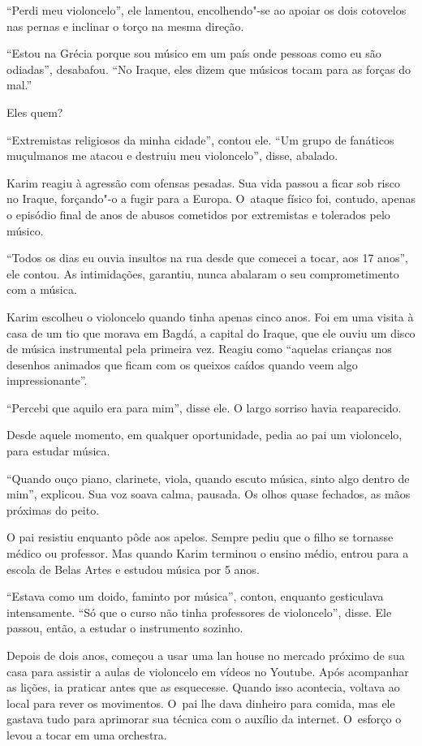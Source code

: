 ``Perdi meu violoncelo'', ele lamentou, encolhendo"-se ao apoiar os dois
cotovelos nas pernas e inclinar o torço na mesma direção.

``Estou na Grécia porque sou músico em um país onde pessoas como eu são
odiadas'', desabafou. ``No Iraque, eles dizem que músicos tocam para as
forças do mal.''

Eles quem?

``Extremistas religiosos da minha cidade'', contou ele. ``Um grupo de
fanáticos muçulmanos me atacou e destruiu meu violoncelo'', disse,
abalado.

Karim reagiu à agressão com ofensas pesadas. Sua vida passou a ficar sob
risco no Iraque, forçando"-o a fugir para a Europa. O~ataque físico foi,
contudo, apenas o episódio final de anos de abusos cometidos por
extremistas e tolerados pelo músico.

``Todos os dias eu ouvia insultos na rua desde que comecei a tocar, aos
17 anos'', ele contou.  As intimidações, garantiu, nunca abalaram o seu
comprometimento com a música.

Karim escolheu o violoncelo quando tinha apenas cinco anos. Foi em uma
visita à casa de um tio que morava em Bagdá, a capital do Iraque, que
ele ouviu um disco de música instrumental pela primeira vez. Reagiu como
``aquelas crianças nos desenhos animados que ficam com os queixos caídos
quando veem algo impressionante''.

``Percebi que aquilo era para mim'', disse ele. O largo sorriso havia
reaparecido.

Desde aquele momento, em qualquer oportunidade, pedia ao pai um
violoncelo, para estudar música.

``Quando ouço piano, clarinete, viola, quando escuto música, sinto algo
dentro de mim'', explicou. Sua voz soava calma, pausada. Os olhos quase
fechados, as mãos próximas do peito.

O pai resistiu enquanto pôde aos apelos. Sempre pediu que o filho se
tornasse médico ou professor. Mas quando Karim terminou o ensino médio,
entrou para a escola de Belas Artes e estudou música por 5 anos.

``Estava como um doido, faminto por música'', contou, enquanto
gesticulava intensamente. ``Só que o curso não tinha professores de
violoncelo'', disse. Ele passou, então, a estudar o instrumento sozinho.

Depois de dois anos, começou a usar uma lan house no mercado próximo de
sua casa para assistir a aulas de violoncelo em vídeos no Youtube. Após
acompanhar as lições, ia praticar antes que as esquecesse. Quando isso
acontecia, voltava ao local para rever os movimentos. O~pai lhe dava
dinheiro para comida, mas ele gastava tudo para aprimorar sua técnica com o
auxílio da internet. O~esforço o levou a tocar em uma orchestra.


